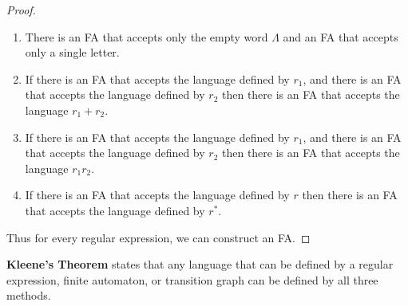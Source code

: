 \begin{proof}
    \begin{enumerate}
        \item There is an FA that accepts only the empty word \(\Lambda\) and an FA that accepts only a single letter.
        \item If there is an FA that accepts the language defined by \(r_1\), and there is an FA that accepts the language defined by \(r_2\) then there is an FA that accepts the language \(r_1+r_2\).
        \item If there is an FA that accepts the language defined by \(r_1\), and there is an FA that accepts the language defined by \(r_2\) then there is an FA that accepts the language \(r_1r_2\).
        \item If there is an FA that accepts the language defined by \(r\) then there is an FA that accepts the language defined by \(r^*\).
    \end{enumerate}
    Thus for every regular expression, we can construct an FA.
\end{proof}


\textbf{Kleene's Theorem} states that any language that can be defined by a regular expression, finite automaton, or transition graph can be defined by all three methods.
